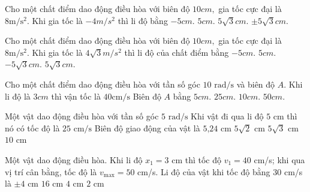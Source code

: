 \begin{ex}
	Cho một chất điểm dao động điều hòa với biên độ $10cm,$ gia tốc cực đại là $\text{8}\text{m/}{{\text{s}}^{\text{2}}}.$ Khi gia tốc là $-4m\text{/}{{s}^{2}}$ thì li độ bằng
	\choice
	{$-5cm.$}
	{\True $5cm.$}
	{$5\sqrt{3}cm.$}
	{$\pm 5\sqrt{3}cm.$}
\end{ex}

\begin{ex}
	Cho một chất điểm dao động điều hòa với biên độ $10cm,$ gia tốc cực đại là $\text{8}\text{m/}{{\text{s}}^{\text{2}}}.$ Khi gia tốc là $4\sqrt{3}m\text{/}s^{2}$ thì li độ của chất điểm bằng
	\choice
	{$-5cm.$}
	{$5cm.$}
	{\True $-5\sqrt{3}cm.$}
	{$5\sqrt{3}cm.$}
\end{ex}

\begin{ex}
	Cho một chất điểm dao động điều hòa với tần số góc $\text{10 rad/s}$ và biên độ $A.$ Khi li độ là $3cm$ thì vận tốc là $\text{40}\text{cm/s}\text{}$ Biên độ $A$ bằng
	\choice
	{\True $5cm.$}
	{$25cm.$}
	{$10cm.$}
	{$50cm.$}
\end{ex}

\begin{ex}
	Một vật dao động điều hòa với tần số góc $\text{5 rad/s}\text{}$ Khi vật đi qua li độ $\text{5 cm}$ thì nó có tốc độ là $\text{25 cm/s}\text{}$ Biên độ giao động của vật là
	\choice
	{$\text{5,24 cm}\text{}$}
	{\True $\text{5}\sqrt{\text{2}}\text{ cm}\text{}$}
	{$\text{5}\sqrt{3}\text{ cm}\text{}$}
	{$\text{10 cm}\text{}$}
\end{ex}

\begin{ex}
	Một vật dao động điều hòa. Khi li độ $x_1=3$ cm thì tốc độ $v_1=40$ cm/s; khi qua vị trí cân bằng, tốc độ là $v_{\max}=50$ cm/s. Li độ của vật khi tốc độ bằng $30$ cm/s là
	\choice
	{\True $\pm4$ cm}
	{$16$ cm}
	{$4$ cm}
	{$2$ cm}
\end{ex}

